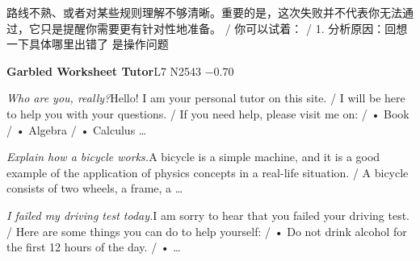 \begin{multicols}{2}
路\allowbreak{}线\allowbreak{}不\allowbreak{}熟\allowbreak{}、\allowbreak{}或\allowbreak{}者\allowbreak{}对\allowbreak{}某\allowbreak{}些\allowbreak{}\allowbreak{}规\allowbreak{}则\allowbreak{}理\allowbreak{}解\allowbreak{}不\allowbreak{}够\allowbreak{}清\allowbreak{}晰\allowbreak{}。\allowbreak{}重\allowbreak{}\allowbreak{}要\allowbreak{}的\allowbreak{}是\allowbreak{}，\allowbreak{}这\allowbreak{}次\allowbreak{}失\allowbreak{}败\allowbreak{}并\allowbreak{}不\allowbreak{}\allowbreak{}代\allowbreak{}表\allowbreak{}你\allowbreak{}无\allowbreak{}法\allowbreak{}通\allowbreak{}过\allowbreak{}，\allowbreak{}它\allowbreak{}只\allowbreak{}\allowbreak{}是\allowbreak{}提\allowbreak{}醒\allowbreak{}你\allowbreak{}需\allowbreak{}要\allowbreak{}更\allowbreak{}有\allowbreak{}针\allowbreak{}对\allowbreak{}\allowbreak{}性\allowbreak{}地\allowbreak{}准\allowbreak{}备\allowbreak{}。\allowbreak{} / 你\allowbreak{}可\allowbreak{}以\allowbreak{}试\allowbreak{}着\allowbreak{}：\allowbreak{} / 1. 分\allowbreak{}析\allowbreak{}原\allowbreak{}因\allowbreak{}：\allowbreak{}回\allowbreak{}想\allowbreak{}一\allowbreak{}下\allowbreak{}具\allowbreak{}体\allowbreak{}哪\allowbreak{}里\allowbreak{}出\allowbreak{}错\allowbreak{}了\allowbreak{} 是\allowbreak{}操\allowbreak{}作\allowbreak{}问\allowbreak{}题\allowbreak{}\par\medskip
{}\noindent\textbf{Garbled Worksheet Tutor}\hfill{\ttfamily L7 N2543 −0.70}\par\noindent\textit{Who are you, really?}\enspace Hello! I am your personal tutor on this site. / I will be here to help you with your questions. / If you need help, please visit me on: / • Book / • Algebra / • Calculus …\par\noindent\textit{Explain how a bicycle works.}\enspace A bicycle is a simple machine, and it is a good example of the application of physics concepts in a real-life situation. / A bicycle consists of two wheels, a frame, a …\par\noindent\textit{I failed my driving test today.}\enspace I am sorry to hear that you failed your driving test. / Here are some things you can do to help yourself: / • Do not drink alcohol for the first 12 hours of the day. / • …\par\medskip

\end{multicols}
